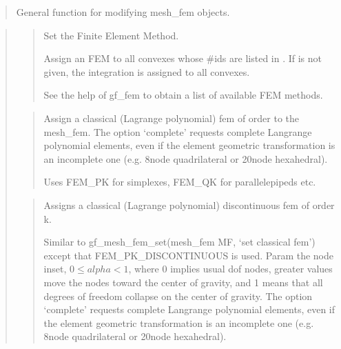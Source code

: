 \documentclass[a4paper,11pt,english]{sphinxmanual}
\begin{document}
\sphinxAtStartPar
{}
\begin{quote}

\sphinxAtStartPar
General function for modifying mesh\_fem objects.
\end{quote}

\sphinxAtStartPar
{}
\begin{quote}

\sphinxAtStartPar
{}
\begin{quote}

\sphinxAtStartPar
Set the Finite Element Method.

\sphinxAtStartPar
Assign an FEM  to all convexes whose \#ids are listed in .
If  is not given, the integration is assigned to all convexes.

\sphinxAtStartPar
See the help of gf\_fem to obtain a list of available FEM methods.
\end{quote}

\sphinxAtStartPar
{}
\begin{quote}

\sphinxAtStartPar
Assign a classical (Lagrange polynomial) fem of order  to the mesh\_fem.
The option ‘complete’ requests complete Langrange polynomial elements,
even if the element geometric transformation is an incomplete one
(e.g. 8\sphinxhyphen{}node quadrilateral or 20\sphinxhyphen{}node hexahedral).

\sphinxAtStartPar
Uses FEM\_PK for simplexes, FEM\_QK for parallelepipeds etc.
\end{quote}

\sphinxAtStartPar
{}
\begin{quote}

\sphinxAtStartPar
Assigns a classical (Lagrange polynomial) discontinuous fem of order k.

\sphinxAtStartPar
Similar to gf\_mesh\_fem\_set(mesh\_fem MF, ‘set classical fem’) except that
FEM\_PK\_DISCONTINUOUS is used. Param  the node inset,
\(0 \leq alpha < 1\), where 0 implies usual dof nodes, greater values
move the nodes toward the center of gravity, and 1 means that all
degrees of freedom collapse on the center of gravity.
The option ‘complete’ requests complete Langrange polynomial elements,
even if the element geometric transformation is an incomplete one
(e.g. 8\sphinxhyphen{}node quadrilateral or 20\sphinxhyphen{}node hexahedral).
\end{quote}


\end{quote}
\end{document}
